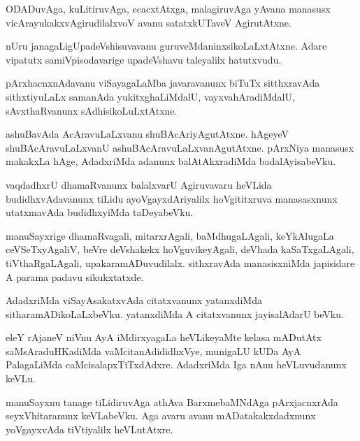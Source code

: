 \documentclass{article}
\begin{document}
\begin{mn}%
ODADuvAga, kuLitiruvAga, ecacxtAtxga, malagiruvAga yAvana manasusx 
vicArayukakxvAgirudilalxvoV avanu satatxkUTaveV AgirutAtxne.
\end{mn}

\begin{mn}%
nUru janagaLigUpadeVshisuvavanu guruveMdaninxsikoLaLxtAtxne.
Adare vipatutx samiVpisodavarige upadeVshavu taleyalilx hatutxvudu.
\end{mn}

\begin{mn}%
pArxhacnxnAdavanu viSayagaLaMba javaravanunx biTuTx sitthxravAda sithxtiyuLaLx samanAda 
yukitxghaLiMdalU, vayxvahAradiMdalU, sAvxthaRvanunx sAdhisikoLuLxtAtxne.
\end{mn}

\begin{mn}%
ashuBavAda AcAravuLaLxvanu shuBAcAriyAgutAtxne. hAgeyeV shuBAcAravuLaLxvanU 
ashuBAcAravuLaLxvanAgutAtxne. pArxNiya manasusx makakxLa hAge, AdadxriMda adanunx 
balAtAkxradiMda badalAyisabeVku.
\end{mn}

\begin{mn}%
vaqdadhxrU dhamaRvanunx balalxvarU Agiruvavaru heVLida budidhxvAdavanunx tiLidu 
ayoVgayxdAriyalilx hoVgititxruva manasasxnunx utatxmavAda budidhxyiMda taDeyabeVku.
\end{mn}

\begin{mn}%
manuSayxrige dhamaRvagali, mitarxrAgali, baMdhugaLAgali, keYkAlugaLa  ceVSeTxyAgaliV, 
beVre deVshakekx hoVguvikeyAgali, deVhada kaSaTxgaLAgali, tiVthaRgaLAgali, 
upakaramADuvudilalx. sithxravAda manasisxniMda japisidare A parama padavu sikukxtatxde.
\end{mn}

\begin{mn}%
AdadxriMda viSayAsakatxvAda citatxvanunx yatanxdiMda sitharamADikoLaLxbeVku. yatanxdiMda A 
citatxvanunx jayisalAdarU beVku.
\end{mn}

\begin{mn}%
eleY rAjaneV niVnu AyA iMdirxyagaLa heVLikeyaMte kelasa mADutAtx saMsAraduHKadiMda 
vaMcitanAdididhxVye, munigaLU kUDa AyA PalagaLiMda caMcisalapxTiTxdAdxre. AdadxriMda Iga 
nAnu heVLuvudanunx keVLu.
\end{mn}

\begin{mn}%
manuSayxnu tanage tiLidiruvAga athAva BarxmebaMNdAga pArxjacnxrAda seyxVhitaranunx 
keVLabeVku. Aga avaru avanu mADatakakxdadxnunx yoVgayxvAda tiVtiyalilx heVLutAtxre.
\end{mn}
\end{document}
